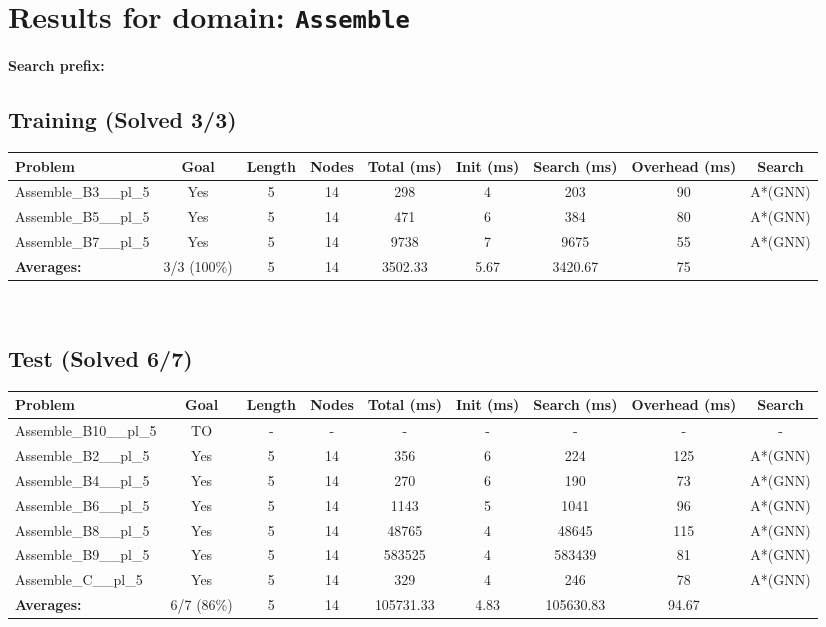 \documentclass{article}
\begin{document}
\section*{Results for domain: \texttt{Assemble}}
\textbf{Search prefix:} 
\\[0.5cm]
\subsection*{Training (Solved 3/3)}
\begin{tabular}{lcccccccc}
\toprule
Problem & Goal & Length & Nodes & Total (ms) & Init (ms) & Search (ms) & Overhead (ms) & Search \\
\midrule
Assemble\_B3\_\_pl\_5 & Yes & 5 & 14 & 298 & 4 & 203 & 90 & A*(GNN) \\
Assemble\_B5\_\_pl\_5 & Yes & 5 & 14 & 471 & 6 & 384 & 80 & A*(GNN) \\
Assemble\_B7\_\_pl\_5 & Yes & 5 & 14 & 9738 & 7 & 9675 & 55 & A*(GNN) \\
\textbf{Averages:} & 3/3 (100\%) & 5 & 14 & 3502.33 & 5.67 & 3420.67 & 75 & \\
\bottomrule
\end{tabular}
\\[0.7cm]
\subsection*{Test (Solved 6/7)}
\begin{tabular}{lcccccccc}
\toprule
Problem & Goal & Length & Nodes & Total (ms) & Init (ms) & Search (ms) & Overhead (ms) & Search \\
\midrule
Assemble\_B10\_\_pl\_5 & TO & - & - & - & - & - & - & - \\
Assemble\_B2\_\_pl\_5 & Yes & 5 & 14 & 356 & 6 & 224 & 125 & A*(GNN) \\
Assemble\_B4\_\_pl\_5 & Yes & 5 & 14 & 270 & 6 & 190 & 73 & A*(GNN) \\
Assemble\_B6\_\_pl\_5 & Yes & 5 & 14 & 1143 & 5 & 1041 & 96 & A*(GNN) \\
Assemble\_B8\_\_pl\_5 & Yes & 5 & 14 & 48765 & 4 & 48645 & 115 & A*(GNN) \\
Assemble\_B9\_\_pl\_5 & Yes & 5 & 14 & 583525 & 4 & 583439 & 81 & A*(GNN) \\
Assemble\_C\_\_pl\_5 & Yes & 5 & 14 & 329 & 4 & 246 & 78 & A*(GNN) \\
\textbf{Averages:} & 6/7 (86\%) & 5 & 14 & 105731.33 & 4.83 & 105630.83 & 94.67 & \\
\bottomrule
\end{tabular}
\\[0.7cm]
\end{document}
